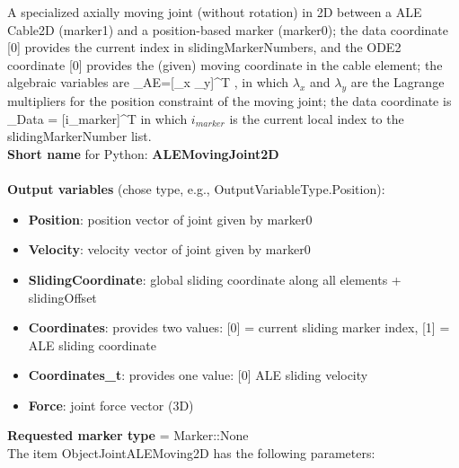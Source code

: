 A specialized axially moving joint (without rotation) in 2D between a ALE Cable2D (marker1) and a position-based marker (marker0); the data coordinate [0] provides the current index in slidingMarkerNumbers, and the ODE2 coordinate [0] provides the (given) moving coordinate in the cable element; the algebraic variables are \be \qv_{AE}=[\lambda_x\;\; \lambda_y]^T \ee, in which $\lambda_x$ and $\lambda_y$ are the Lagrange multipliers for the position constraint of the moving joint; the data coordinate is \be \qv_{Data} = [i_{marker}]^T \ee in which $i_{marker}$ is the current local index to the slidingMarkerNumber list.
 \\
{\bf Short name} for Python: {\bf ALEMovingJoint2D}
 \\\\ 
{\bf Output variables} (chose type, e.g., OutputVariableType.Position): 
\begin{itemize}
    \item {\bf Position}: position vector of joint given by marker0
    \item {\bf Velocity}: velocity vector of joint given by marker0
    \item {\bf SlidingCoordinate}: global sliding coordinate along all elements + slidingOffset
    \item {\bf Coordinates}: provides two values: [0] = current sliding marker index, [1] = ALE sliding coordinate
    \item {\bf Coordinates\_t}: provides one value: [0] ALE sliding velocity
    \item {\bf Force}: joint force vector (3D)
\end{itemize}
  {\bf Requested marker type} = Marker::None \\ 
The item ObjectJointALEMoving2D has the following parameters:
